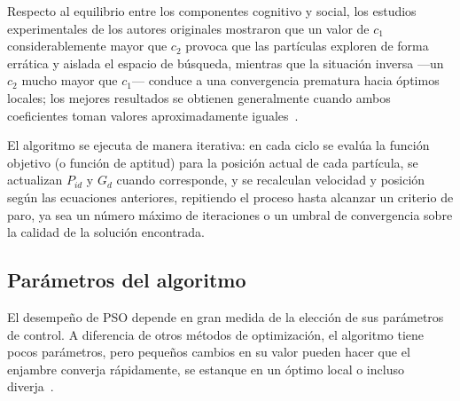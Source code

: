 Respecto al equilibrio entre los componentes cognitivo y social, los estudios experimentales de los autores originales mostraron que un valor de $c_1$ considerablemente mayor que $c_2$ provoca que las partículas exploren de forma errática y aislada el espacio de búsqueda, mientras que la situación inversa ---un $c_2$ mucho mayor que $c_1$--- conduce a una convergencia prematura hacia óptimos locales; los mejores resultados se obtienen generalmente cuando ambos coeficientes toman valores aproximadamente iguales~\cite{collet_stochastic_2007}.

El algoritmo se ejecuta de manera iterativa: en cada ciclo se evalúa la función objetivo (o función de aptitud) para la posición actual de cada partícula, se actualizan $P_{id}$ y $G_d$ cuando corresponde, y se recalculan velocidad y posición según las ecuaciones anteriores, repitiendo el proceso hasta alcanzar un criterio de paro, ya sea un número máximo de iteraciones o un umbral de convergencia sobre la calidad de la solución encontrada.

\subsection{Parámetros del algoritmo}
\label{sec:parametros}

El desempeño de PSO depende en gran medida de la elección de sus parámetros de control. A diferencia de otros métodos de optimización, el algoritmo tiene pocos parámetros, pero pequeños cambios en su valor pueden hacer que el enjambre converja rápidamente, se estanque en un óptimo local o incluso diverja~\cite{poli2007overview, shi1998parameter}.

